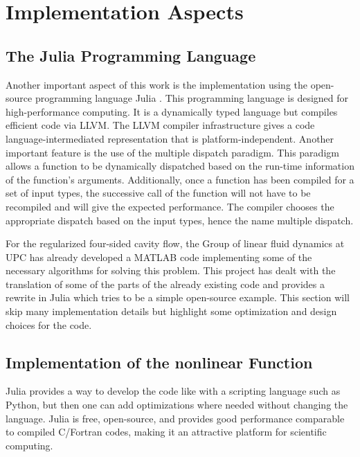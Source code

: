 
\section{Implementation Aspects} \label{sec:impl}

\subsection{The Julia Programming Language}

Another important aspect of this work is the implementation using the
open-source programming language Julia \citep{bezanson2017}. This programming
language is designed for high-performance computing. It is a dynamically typed
language but compiles efficient code via LLVM. The LLVM compiler infrastructure
gives a code language-intermediated representation that is
platform-independent. Another important feature is the use of the multiple
dispatch paradigm. This paradigm allows a function to be dynamically dispatched
based on the run-time information of the function's arguments. Additionally,
once a function has been compiled for a set of input types, the successive call
of the function will not have to be recompiled and will give the expected
performance. The compiler chooses the appropriate dispatch based on the input
types, hence the name multiple dispatch.

For the regularized four-sided cavity flow, the Group of linear fluid dynamics
at UPC has already developed a MATLAB code implementing some of the necessary
algorithms for solving this problem. This project has dealt with the
translation of some of the parts of the already existing code and provides a
rewrite in Julia which tries to be a simple open-source example. This section
will skip many implementation details but highlight some optimization and
design choices for the code.

\subsection{Implementation of the nonlinear Function}

Julia provides a way to develop the code like with a scripting language such as
Python, but then one can add optimizations where needed without changing the
language. Julia is free, open-source, and provides good performance comparable
to compiled C/Fortran codes, making it an attractive platform for scientific
computing. 

